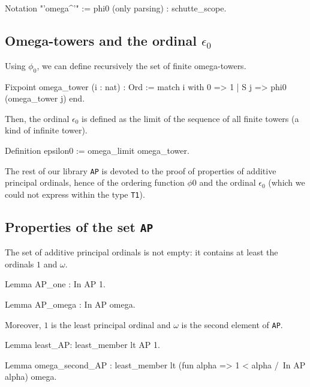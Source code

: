 {\begin{Coqsrc}
Notation "'omega^'" := phi0 (only parsing) : schutte_scope.
\end{Coqsrc}

\subsection{Omega-towers and the ordinal \texorpdfstring{$\epsilon_0$}{epsilon0}}


Using $\phi_0$, we can define recursively the set of finite omega-towers.


\begin{Coqsrc}
Fixpoint omega_tower (i : nat) : Ord :=
  match i with
    0 =>  1
  | S j => phi0 (omega_tower j)
  end.
\end{Coqsrc}

\label{sect:epsilon0-as-limit}
Then, the ordinal  $\epsilon_0$ is defined as the limit of the sequence of all finite towers (a kind of infinite tower).

\begin{Coqsrc}
Definition epsilon0 := omega_limit omega_tower.
\end{Coqsrc}

The rest of our library \texttt{AP} is devoted to the proof of properties of additive principal ordinals, hence of the ordering function  $\phi0$ and the ordinal $\epsilon_0$ (which we could not express within the type \texttt{T1}).

\subsection{Properties of the set  \texttt{AP}}

The set of additive principal ordinals is not empty: it contains at least the ordinals  $1$ and  $\omega$. 

\begin{Coqsrc}
Lemma AP_one : In AP 1.

Lemma AP_omega : In AP omega.
\end{Coqsrc}

Moreover, $1$ is the least principal ordinal and $\omega$ is the second element of
\texttt{AP}.


\begin{Coqsrc}
Lemma least_AP: least_member  lt AP 1. 

Lemma omega_second_AP :
  least_member   lt 
                  (fun alpha => 1 < alpha /\ In AP alpha)
                  omega.
\end{Coqsrc}

}
